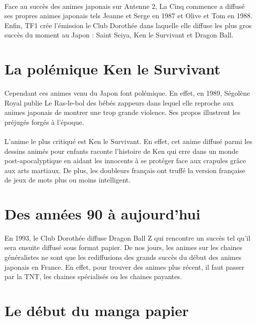 \paragraph{}
Face au succès des animes japonais sur Antenne 2, La Cinq commence a diffusé ses propres animes japonais tels Jeanne et Serge en 1987 et Olive et Tom en 1988. Enfin, TF1 crée l’émission le Club Dorothée dans laquelle elle diffuse les plus gros succès du moment au Japon : Saint Seiya, Ken le Survivant et Dragon Ball. 

\section{La polémique Ken le Survivant}
\paragraph{}
Cependant ces animes venu du Japon font polémique. En effet, en 1989, Ségolène Royal publie Le Ras-le-bol des bébés zappeurs dans lequel elle reproche aux animes japonais de montrer une trop grande violence. Ses propos illustrent les préjugés forgés à l’époque. 
\paragraph{}
L’anime le plus critiqué est Ken le Survivant. En effet, cet anime diffusé parmi les dessins animés pour enfants raconte l’histoire de Ken qui erre dans un monde post-apocalyptique en aidant les innocents à se protéger face aux crapules grâce aux arts martiaux. De plus, les doubleurs français ont truffé la version française de jeux de mots plus ou moins intelligent.

\section{Des années 90 à aujourd'hui}
\paragraph{}
En 1993, le Club Dorothée diffuse Dragon Ball Z qui rencontre un  succès tel qu’il sera ensuite diffusé sous format papier. De nos jours, les animes sur les chaines généralistes ne sont que les rediffusions des grands succès du début des animes japonais en France.  En effet, pour trouver des animes plus récent, il faut passer par la TNT, les chaines spécialisés ou les chaines payantes. 

\section{Le début du manga papier}
